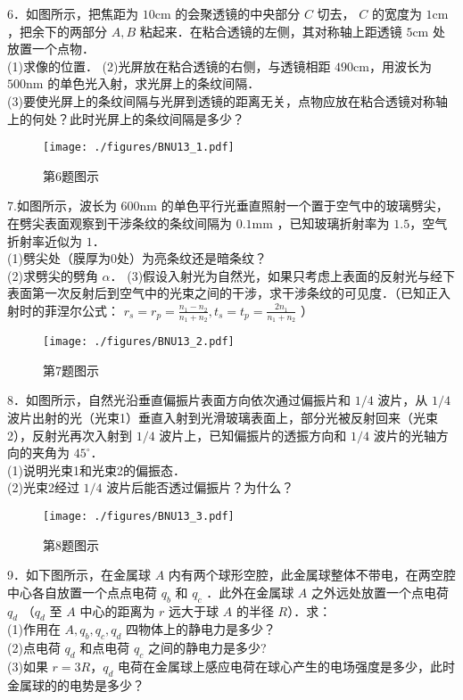 6．如图所示，把焦距为 $10\mathrm{cm}$ 的会聚透镜的中央部分 $C$ 切去， $C$ 的宽度为 $1\mathrm{cm}$ ，把余下的两部分 $A,B$ 粘起来．在粘合透镜的左侧，其对称轴上距透镜 $5\mathrm{cm}$ 处放置一个点物．\\
(1)求像的位置．
(2)光屏放在粘合透镜的右侧，与透镜相距 $490\mathrm{cm}$，用波长为 $500\mathrm{nm}$ 的单色光入射，求光屏上的条纹间隔．\\
(3)要使光屏上的条纹间隔与光屏到透镜的距离无关，点物应放在粘合透镜对称轴上的何处？此时光屏上的条纹间隔是多少？
\begin{figure}[ht]
\centering
\texttt{[image: ./figures/BNU13\_1.pdf]}
\caption{第6题图示} \label{BNU13_fig1}
\end{figure}
7.如图所示，波长为 $600\mathrm{nm}$ 的单色平行光垂直照射一个置于空气中的玻璃劈尖，在劈尖表面观察到干涉条纹的条纹间隔为 $0.1\mathrm{mm}$ ，已知玻璃折射率为 $1.5$，空气折射率近似为 $1$．\\
(1)劈尖处（膜厚为0处）为亮条纹还是暗条纹？\\
(2)求劈尖的劈角 $\alpha$．
(3)假设入射光为自然光，如果只考虑上表面的反射光与经下表面第一次反射后到空气中的光束之间的干涉，求干涉条纹的可见度．（已知正入射时的菲涅尔公式： $r_s=r_p=\frac{n_1-n_2}{n_1+n_2},t_s=t_p=\frac{2n_1}{n_1+n_2}$ ）
\begin{figure}[ht]
\centering
\texttt{[image: ./figures/BNU13\_2.pdf]}
\caption{第7题图示} \label{BNU13_fig2}
\end{figure}
8．如图所示，自然光沿垂直偏振片表面方向依次通过偏振片和 $1/4$ 波片，从 $1/4$ 波片出射的光（光束1）垂直入射到光滑玻璃表面上，部分光被反射回来（光束2），反射光再次入射到 $1/4$ 波片上，已知偏振片的透振方向和 $1/4$ 波片的光轴方向的夹角为 $45^\circ$．\\
(1)说明光束1和光束2的偏振态．\\
(2)光束2经过 $1/4$ 波片后能否透过偏振片？为什么？
\begin{figure}[ht]
\centering
\texttt{[image: ./figures/BNU13\_3.pdf]}
\caption{第8题图示} \label{BNU13_fig3}
\end{figure}
9．如下图所示，在金属球 $A$ 内有两个球形空腔，此金属球整体不带电，在两空腔中心各自放置一个点点电荷 $q_b$ 和 $q_c$ ．此外在金属球 $A$ 之外远处放置一个点电荷 $q_d$ （$q_d$ 至 $A$ 中心的距离为 $r$ 远大于球 $A$ 的半径 $R$）．求：\\
(1)作用在 $A,q_b,q_c,q_d$ 四物体上的静电力是多少？\\
(2)点电荷 $q_d$ 和点电荷 $q_c$ 之间的静电力是多少?\\
(3)如果 $r=3R$，$q_d$ 电荷在金属球上感应电荷在球心产生的电场强度是多少，此时金属球的的电势是多少？

